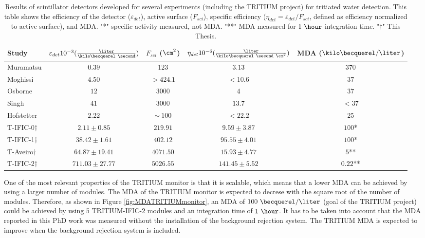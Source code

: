 \begin{enumerate}
\begin{table}[htbp]
\centering{}%
\begin{tabular}{lcccc}
\toprule 
Study & \parbox{5.5em}{$\varepsilon_{det}10^{-3}(\frac{\liter}{\kilo\becquerel~\second})$}  & \parbox{4.5em}{$F_{sci}$ ($\cm^2$)}  & \parbox{6.5em}{$\eta_{det}10^{-6}(\frac{\liter}{\kilo\becquerel~\second~\cm^2})$} & MDA ($\kilo\becquerel / \liter$) \tabularnewline
\midrule
\midrule 
Muramatsu \cite{Muramatsu} & $0.39$ & $123$ & $3.13$ & $370$ \tabularnewline
Moghissi \cite{Moghissi} & $4.50$ & $>424.1$ & $<10.6$ & $37$ \tabularnewline
Osborne \cite{Osborne} & $12$ & $3000$ & $4$ & $37$ \tabularnewline
Singh \cite{Ratnakaran, Ratnakaran2000} & $41$ & $3000$ & $13.7$ & $<37$ \tabularnewline
Hofstetter \cite{Hofstetter1, Hofstetter2} & $2.22$ & $\sim~100$ & $<22.2$ & $25$ \tabularnewline
T-IFIC-0$\dagger$ & $2.11 \pm 0.85$ & $219.91$ & $9.59 \pm 3.87$ & $100$* \tabularnewline
T-IFIC-1$\dagger$ & $38.42 \pm 1.61$ & $402.12$ & $95.55 \pm 4.01$ & $100$* \tabularnewline
T-Aveiro$\dagger$ & $64.87 \pm 19.41$ & $4071.50$ & $15.93 \pm 4.77$ & $5$** \tabularnewline
T-IFIC-2$\dagger$ & $711.03 \pm 27.77$ & $5026.55$ & $141.45 \pm 5.52$ & $0.22$** \tabularnewline
\bottomrule
\end{tabular}
\caption{Results of scintillator detectors developed for several experiments (including the TRITIUM project) for tritiated water detection. This table shows the efficiency of the detector ($\varepsilon_{det}$), active surface ($F_{sci}$), specific efficiency ($\eta_{det}=\varepsilon_{det}/F_{sci}$, defined as efficiency normalized to active surface), and MDA. 
"*" specific activity measured, not MDA. 
"**" MDA measured for $1~\hour$ integration time.
"$\dagger$" This Thesis.}
\label{tab:ComparisonResultsTritium}
\end{table}

One of the most relevant properties of the TRITIUM monitor is that it is scalable, which means that a lower MDA can be achieved by using a larger number of modules. The MDA of the TRITIUM monitor is expected to decrese with the square root of the number of modules. Therefore, as shown in Figure \ref{fig:MDATRITIUMmonitor}, an MDA of  $100~\becquerel/\liter$ (goal of the TRITIUM project) could be achieved by using 5 TRITIUM-IFIC-2 modules and an integration time of $1~\hour$. It has to be taken into account that the MDA reported in this PhD work was measured without the installation of the background rejection system. The TRITIUM MDA is expected to improve when the background rejection system is included.


\end{enumerate}
